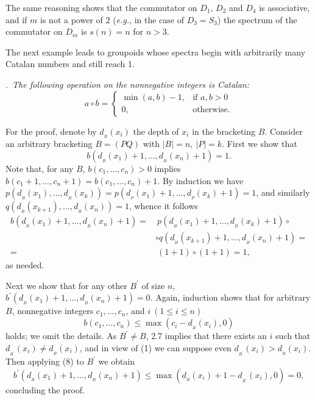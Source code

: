 \documentclass[a4paper,reqno]{amsart}\usepackage{amssymb,latexsym}
\theoremstyle{definition}
\theoremstyle{remark}
\numberwithin{equation}{section}
\numberwithin{theorem}{section}
\begin{document}
The same reasoning shows that the commutator on $D_{1},\,D_{2}$ and $D_{4}$ is
associative, and if $m$ is not a power of $2$ (\textit{e.g.}, in the case of
$D_{3}=S_{3}$) the spectrum of the commutator on $D_{m}$ is $s(n)=n$ for $n>3$.

\medskip

The next example leads to groupoids whose spectra begin with arbitrarily many
Catalan numbers and still reach 1.

\bigskip

.\textit{\ The following operation on the nonnegative integers is
Catalan:}\[
a\circ b=\begin{cases}
\min(a,b)-1, & \text{if }a,b>0\\
0, & \text{otherwise.}\end{cases}
\]

For the proof, denote by $d_{{}_{B}}(x_{i})$ the depth of $x_{i}$ in the
bracketing $B$. Consider an arbitrary bracketing $B=(PQ)$ with $|B|=n,~|P|=k$.
First we show that\[
b(d_{{}_{B}}(x_{1})+1,\ldots,d_{{}_{B}}(x_{n})+1)=1.
\]
Note that, for any $B$, $b(c_{1},\ldots,c_{n})>0$ implies $b(c_{1}+1,\ldots,c_{n}+1)=b(c_{1},\ldots,c_{n})+1$. By induction we have $p(d_{{}_{B}}(x_{1}),\ldots,d_{{}_{B}}(x_{k}))=p(d_{{}_{P}}(x_{1})+1,\ldots,d_{{}_{P}}(x_{k})+1)=1$, and similarly $q(d_{{}_{B}}(x_{k+1}),\ldots,d_{{}_{B}}(x_{n}))=1$, whence it follows\begin{align*}
b(d_{{}_{B}}(x_{1})+1,\ldots,d_{{}_{B}}(x_{n})+1)=  &  \ p(d_{{}_{B}}(x_{1})+1,\ldots,d_{{}_{B}}(x_{k})+1)\circ\\
&  \circ q(d_{{}_{B}}(x_{k+1})+1,\ldots,d_{{}_{B}}(x_{n})+1)=\\
=  &  \ (1+1)\circ(1+1)=1,
\end{align*}
as needed.

Next we show that for any other $B^{\prime}$ of size $n$, $b^{\prime}(d_{{}_{B}}(x_{1})+1,\ldots,d_{{}_{B}}(x_{n})+1)=0$. Again, induction shows
that for arbitrary $B$, nonnegative integers $c_{1},\ldots,c_{n}$, and
$i~(1\leq i\leq n)$\begin{equation}
b(c_{1},\ldots,c_{n})\leq\max(c_{i}-d_{{}_{B}}(x_{i}),0) \tag{8}\end{equation}
holds; we omit the details. As $B^{\prime}\neq B$, 2.7 implies that there
exists an $i$ such that $d_{{}_{B^{\prime}}}(x_{i})\neq d_{{}_{B}}(x_{i})$,
and in view of (1) we can suppose even $d_{{}_{B^{\prime}}}(x_{i})>d_{{}_{B}}(x_{i})$. Then applying (8) to $B^{\prime}$ we obtain\[
b^{\prime}(d_{{}_{B}}(x_{1})+1,\ldots,d_{{}_{B}}(x_{n})+1)\leq\max(d_{{}_{B}}(x_{i})+1-d_{{}_{B^{\prime}}}(x_{i}),0)=0,
\]
concluding the proof.
\end{document}
